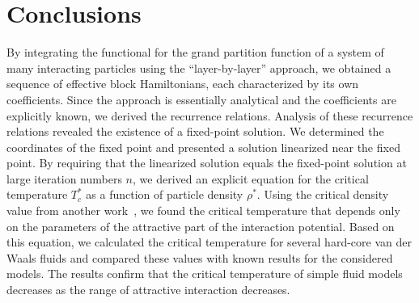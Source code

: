 \section{Conclusions}
By integrating the functional for the grand partition function of a system of many interacting particles using the ``layer-by-layer'' approach, we obtained a sequence of effective block Hamiltonians, each characterized by its own coefficients. Since the approach is essentially analytical and the coefficients are explicitly known, we derived the recurrence relations. Analysis of these recurrence relations revealed the existence of a fixed-point solution. We determined the coordinates of the fixed point and presented a solution linearized near the fixed point. By requiring that the linearized solution equals the fixed-point solution at large iteration numbers $n$, we derived an explicit equation for the critical temperature $T^*_c$ as a function of particle density $\rho^*$.
Using the critical density value from another work~\cite{YukhJSP1995}, we found the critical temperature that depends only on the parameters of the attractive part of the interaction potential. Based on this equation, we calculated the critical temperature for several hard-core van der Waals fluids and compared these values with known results for the considered models. The results confirm that the critical temperature of simple fluid models decreases as the range of attractive interaction decreases.
